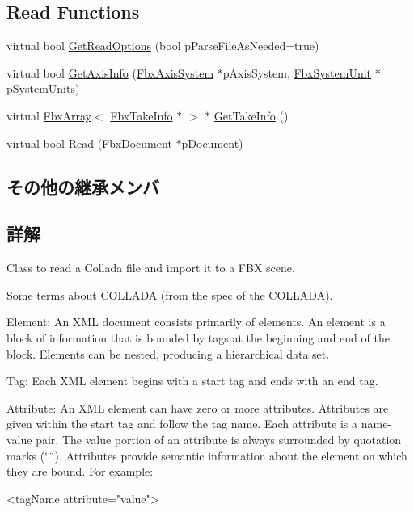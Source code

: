 \subsection*{Read Functions}
\begin{DoxyCompactItemize}
\item 
virtual bool \hyperlink{class_fbx_reader_collada_a23cea871d527b8695ebdeade47b1938e}{Get\+Read\+Options} (bool p\+Parse\+File\+As\+Needed=true)
\item 
virtual bool \hyperlink{class_fbx_reader_collada_aed6cb43bb8262e63260088ad8abcf2e6}{Get\+Axis\+Info} (\hyperlink{class_fbx_axis_system}{Fbx\+Axis\+System} $\ast$p\+Axis\+System, \hyperlink{class_fbx_system_unit}{Fbx\+System\+Unit} $\ast$p\+System\+Units)
\item 
virtual \hyperlink{class_fbx_array}{Fbx\+Array}$<$ \hyperlink{class_fbx_take_info}{Fbx\+Take\+Info} $\ast$ $>$ $\ast$ \hyperlink{class_fbx_reader_collada_af772ad8fc79672d06aa9ea6910b81ab0}{Get\+Take\+Info} ()
\item 
virtual bool \hyperlink{class_fbx_reader_collada_afbffa96769d22d8e5df25c83d15bd8cb}{Read} (\hyperlink{class_fbx_document}{Fbx\+Document} $\ast$p\+Document)
\end{DoxyCompactItemize}
\subsection*{その他の継承メンバ}


\subsection{詳解}
Class to read a Collada file and import it to a F\+BX scene.

Some terms about C\+O\+L\+L\+A\+DA (from the spec of the C\+O\+L\+L\+A\+DA).

Element\+: An X\+ML document consists primarily of elements. An element is a block of information that is bounded by tags at the beginning and end of the block. Elements can be nested, producing a hierarchical data set.

Tag\+: Each X\+ML element begins with a start tag and ends with an end tag.

Attribute\+: An X\+ML element can have zero or more attributes. Attributes are given within the start tag and follow the tag name. Each attribute is a name-\/value pair. The value portion of an attribute is always surrounded by quotation marks (\char`\"{} \char`\"{}). Attributes provide semantic information about the element on which they are bound. For example\+: 
\begin{DoxyCode}
<tagName attribute=\textcolor{stringliteral}{"value"}>
\end{DoxyCode}


